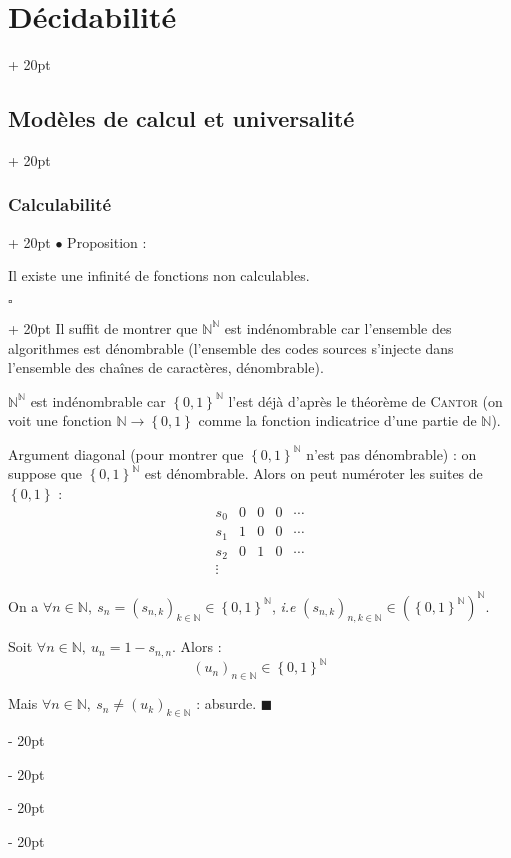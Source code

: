 \documentclass[a4paper, 12pt, twoside]{article}
\newcommand{\N}{\mathbb{N}} %
\newcommand{\lr}[1]{\left( #1 \right)}
\newcommand{\set}[1]{\left\{ #1 \right\}}
\newcommand{\ind}[1][20pt]{\advance\leftskip + #1}
\newcommand{\deind}[1][20pt]{\advance\leftskip - #1}
\newenvironment{indt}[2][20pt]{#2 \par \ind[#1]}{\par \deind} %
\newenvironment{proof}[1][{}]{\begin{indt}{$\square$ #1}}{$\blacksquare$ \end{indt}}
\begin{document}
\begin{indt}{\section{Décidabilité}}
\begin{indt}{\subsection{Modèles de calcul et universalité}}
\begin{indt}{\subsubsection{Calculabilité}}
                $\bullet$ Proposition :

                \begin{emphBox}
                    Il existe une infinité de fonctions non calculables.
                \end{emphBox}

                \vspace{6pt}
                
                \begin{proof}
                    Il suffit de montrer que $\N^\N$ est indénombrable car l'ensemble des algorithmes est dénombrable (l'ensemble des codes sources s'injecte dans l'ensemble des chaînes de caractères, dénombrable).

                    $\N^\N$ est indénombrable car $\set{0, 1}^\N$ l'est déjà d'après le théorème de \textsc{Cantor} (on voit une fonction $\N \longrightarrow \set{0, 1}$ comme la fonction indicatrice d'une partie de $\N$).

                    \vspace{12pt}
                    
                    Argument diagonal (pour montrer que $\set{0, 1}^\N$ n'est pas dénombrable) : on suppose que $\set{0, 1}^\N$ est dénombrable. Alors on peut numéroter les suites de $\set{0, 1}$ :
                    \[
                        \begin{array}{ccccc}
                            s_0 & 0 & 0 & 0 & \cdots
                            \\
                            s_1 & 1 & 0 & 0 & \cdots
                            \\
                            s_2 & 0 & 1 & 0 & \cdots
                            \\
                            \vdots
                        \end{array}
                    \]

                    On a $\forall n \in \N,\ s_n = \lr{s_{n, k}}_{k \in \N} \in \set{0, 1}^\N$, \textit{i.e} $\lr{s_{n, k}}_{n, k \in \N} \in \lr{\set{0, 1}^\N}^\N$.

                    Soit $\forall n \in \N,\ u_n = 1 - s_{n, n}$. Alors :
                    \[
                        \lr{u_n}_{n \in \N} \in \set{0, 1}^\N
                    \]

                    Mais $\forall n \in \N,\ s_n \neq \lr{u_k}_{k \in \N}$ : absurde.
                \end{proof}
            \end{indt}


\end{indt}
\end{indt}
\end{document}

